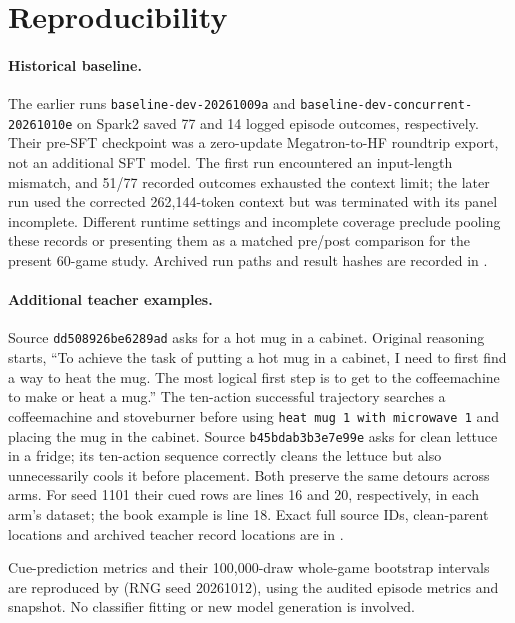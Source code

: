 \documentclass[10pt,letterpaper]{article}
\newcommand{\code}[1]{\texttt{#1}}
\begin{document}
\section{Reproducibility}
\paragraph{Historical baseline.}\label{app:baseline}
The earlier runs \code{baseline-dev-20261009a} and \code{baseline-dev-concurrent-20261010e} on Spark2 saved 77 and 14 logged episode outcomes, respectively. Their pre-SFT checkpoint was a zero-update Megatron-to-HF roundtrip export, not an additional SFT model. The first run encountered an input-length mismatch, and 51/77 recorded outcomes exhausted the context limit; the later run used the corrected 262,144-token context but was terminated with its panel incomplete. Different runtime settings and incomplete coverage preclude pooling these records or presenting them as a matched pre/post comparison for the present 60-game study. Archived run paths and result hashes are recorded in .

\paragraph{Additional teacher examples.}
Source \code{dd508926be6289ad} asks for a hot mug in a cabinet. Original reasoning starts, ``To achieve the task of putting a hot mug in a cabinet, I need to first find a way to heat the mug. The most logical first step is to get to the coffeemachine to make or heat a mug.'' The ten-action successful trajectory searches a coffeemachine and stoveburner before using \code{heat mug 1 with microwave 1} and placing the mug in the cabinet. Source \code{b45bdab3b3e7e99e} asks for clean lettuce in a fridge; its ten-action sequence correctly cleans the lettuce but also unnecessarily cools it before placement. Both preserve the same detours across arms. For seed 1101 their cued rows are lines 16 and 20, respectively, in each arm's dataset; the book example is line 18. Exact full source IDs, clean-parent locations and archived teacher record locations are in .

Cue-prediction metrics and their 100,000-draw whole-game bootstrap intervals are reproduced by  (RNG seed 20261012), using the audited episode metrics and snapshot. No classifier fitting or new model generation is involved.
\end{document}
